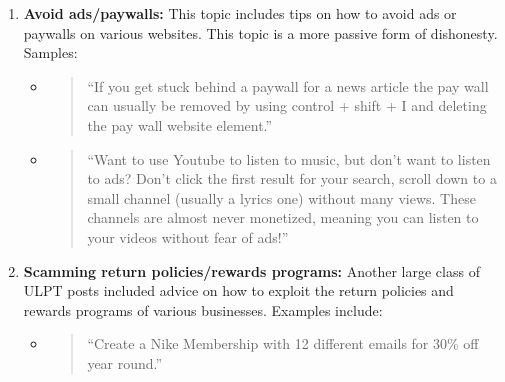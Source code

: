 \documentclass{amsart}
\theoremstyle{definition}
\theoremstyle{remark}
\newcommand{\tql}{\textquotedblleft}
\newcommand{\tqr}{\textquotedblright}
\begin{document}
\begin{enumerate}

\item \textbf{Avoid ads/paywalls:} This topic includes tips on how to avoid ads or paywalls on various websites.  This topic is a more passive form of dishonesty.  Samples:

\begin{itemize}

\item \begin{quote}
\tql If you get stuck behind a paywall for a news article the pay wall can usually be removed by using control + shift + I and deleting the pay wall website element.\tqr
\end{quote}
%
%

\item \begin{quote}
\tql Want to use Youtube to listen to music, but don't want to listen to ads? Don't click the first result for your search, scroll down to a small channel (usually a lyrics one) without many views. These channels are almost never monetized, meaning you can listen to your videos without fear of ads!\tqr
\end{quote}

\end{itemize}

\item \textbf{Scamming return policies/rewards programs:} Another large class of ULPT posts included advice on how to exploit the return policies and rewards programs of various businesses.  Examples include:

\begin{itemize}

\item \begin{quote}
\tql Create a Nike Membership with 12 different emails for 30\% off year round.\tqr
\end{quote}
%


\end{itemize}
\end{enumerate}
\end{document}
